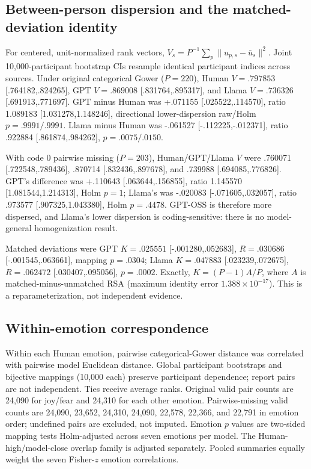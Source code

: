 \subsection{Between-person dispersion and the matched-deviation identity}
\label{app:dispersion}

For centered, unit-normalized rank vectors, $V_s=P^{-1}\sum_p\|u_{p,s}-\bar u_s\|^2$. Joint 10,000-participant bootstrap CIs resample identical participant indices across sources. Under original categorical Gower ($P=220$), Human $V=.797853$ [.764182,.824265], GPT $V=.869008$ [.831764,.895317], and Llama $V=.736326$ [.691913,.771697]. GPT minus Human was +.071155 [.025522,.114570], ratio 1.089183 [1.031278,1.148246], directional lower-dispersion raw/Holm $p=.9991/.9991$. Llama minus Human was -.061527 [-.112225,-.012371], ratio .922884 [.861874,.984262], $p=.0075/.0150$.

With code 0 pairwise missing ($P=203$), Human/GPT/Llama $V$ were .760071 [.722548,.789436], .870714 [.832436,.897678], and .739988 [.694085,.776826]. GPT's difference was +.110643 [.063644,.156855], ratio 1.145570 [1.081544,1.214313], Holm $p=1$; Llama's was -.020083 [-.071605,.032057], ratio .973577 [.907325,1.043380], Holm $p=.4478$. GPT-OSS is therefore more dispersed, and Llama's lower dispersion is coding-sensitive: there is no model-general homogenization result.

Matched deviations were GPT $K=.025551$ [-.001280,.052683], $R=.030686$ [-.001545,.063661], mapping $p=.0304$; Llama $K=.047883$ [.023239,.072675], $R=.062472$ [.030407,.095056], $p=.0002$. Exactly, $K=(P-1)A/P$, where $A$ is matched-minus-unmatched RSA (maximum identity error $1.388\times10^{-17}$). This is a reparameterization, not independent evidence.

\subsection{Within-emotion correspondence}
\label{app:within-emotion}

Within each Human emotion, pairwise categorical-Gower distance was correlated with pairwise model Euclidean distance. Global participant bootstraps and bijective mappings (10,000 each) preserve participant dependence; report pairs are not independent. Ties receive average ranks. Original valid pair counts are 24,090 for joy/fear and 24,310 for each other emotion. Pairwise-missing valid counts are 24,090, 23,652, 24,310, 24,090, 22,578, 22,366, and 22,791 in emotion order; undefined pairs are excluded, not imputed. Emotion $p$ values are two-sided mapping tests Holm-adjusted across seven emotions per model. The Human-high/model-close overlap family is adjusted separately. Pooled summaries equally weight the seven Fisher-$z$ emotion correlations.

